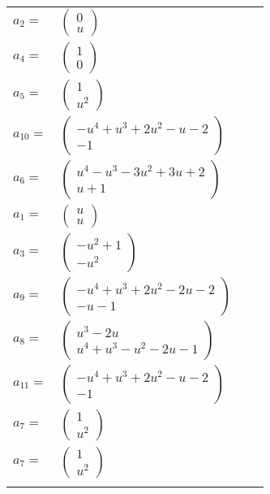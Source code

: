 \documentclass[1p]{elsarticle_modified}
\theoremstyle{definition}
\begin{document}
\begin{tabular}{m{7pt} m{180pt} m{7pt} m{180pt} }
\flushright $a_{2}=$&$\begin{pmatrix}0\\u\end{pmatrix}$ \\
\flushright $a_{4}=$&$\begin{pmatrix}1\\0\end{pmatrix}$ \\
\flushright $a_{5}=$&$\begin{pmatrix}1\\u^2\end{pmatrix}$ \\
\flushright $a_{10}=$&$\begin{pmatrix}- u^4+u^3+2 u^2- u-2\\-1\end{pmatrix}$ \\
\flushright $a_{6}=$&$\begin{pmatrix}u^4- u^3-3 u^2+3 u+2\\u+1\end{pmatrix}$ \\
\flushright $a_{1}=$&$\begin{pmatrix}u\\u\end{pmatrix}$ \\
\flushright $a_{3}=$&$\begin{pmatrix}- u^2+1\\- u^2\end{pmatrix}$ \\
\flushright $a_{9}=$&$\begin{pmatrix}- u^4+u^3+2 u^2-2 u-2\\- u-1\end{pmatrix}$ \\
\flushright $a_{8}=$&$\begin{pmatrix}u^3-2 u\\u^4+u^3- u^2-2 u-1\end{pmatrix}$ \\
\flushright $a_{11}=$&$\begin{pmatrix}- u^4+u^3+2 u^2- u-2\\-1\end{pmatrix}$ \\
\flushright $a_{7}=$&$\begin{pmatrix}1\\u^2\end{pmatrix}$\\ \flushright $a_{7}=$&$\begin{pmatrix}1\\u^2\end{pmatrix}$\\&\end{tabular}
\end{document}
